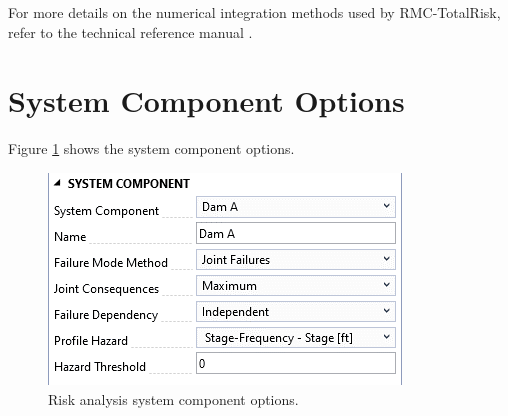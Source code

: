 \documentclass[
]{book}
\begin{document}
For more details on the numerical integration methods used by RMC-TotalRisk, refer to the technical reference manual \citep{cite-TechRef}.

\hypertarget{system-component-options}{%
\section{System Component Options}\label{system-component-options}}

Figure \ref{fig:figure-128} shows the system component options.

\begin{figure}

{\centering \includegraphics{images/figure128} 

}

\caption{Risk analysis system component options.}\label{fig:figure-128}
\end{figure}
\end{document}
